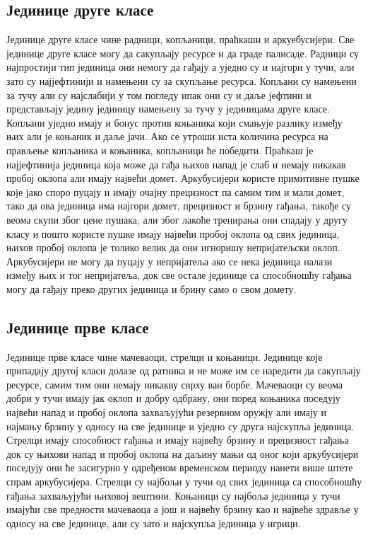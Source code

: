 \documentclass[11pt,a4paper]{article}
\begin{document}
\subsection{Јединице друге класе}
Јединице друге класе чине радници, копљаници, праћкаши и аркуебусијери. Све јединице друге класе могу да сакупљају ресурсе и да граде палисаде. Радници су најпростији тип јединица они немогу да гађају а уједно су и најгори у тучи, али зато су најјефтинији и намењени су за скупљање ресурса. Копљани су намењени за тучу али су најслабији у том погледу ипак они су и даље јефтини и представљају једину јединицу намењену за тучу у јединицама друге класе. Копљани уједно имају и бонус против коњаника који смањује разлику између њих али је коњаник и даље јачи. Ако се утроши иста количина ресурса на прављење копљаника и коњаника, копљаници ће победити. Праћкаш је најјефтинија јединица која може да гађа њихов напад је слаб и немају никакав пробој оклопа али имају највећи домет. Аркубусијери користе примитивне пушке које јако споро пуцају и имају очајну прецизност па самим тим и мали домет, тако да ова јединица има најгори домет, прецизност и брзину гађања, такође су веома скупи због цене пушака, али због лакоће тренирања они спадају у другу класу и пошто користе пушке имају највећи пробој оклопа од свих јединица, њихов пробој оклопа је толико велик да они игноришу непријатељски оклоп. Аркубусијери не могу да пуцају у непријатеља ако се нека јединица налази између њих и тог непријатеља, док све остале јединице са способношћу гађања могу да гађају преко других јединица и брину само о свом домету.

\subsection{Јединице прве класе}
Јединице прве класе чине  мачеваоци, стрелци и коњаници. Јединице које припадају другој класи долазе од ратника и не може им се наредити да сакупљају ресурсе, самим тим они немају никакву сврху ван борбе. Мачеваоци су веома добри у тучи имају јак оклоп и добру одбрану, они поред коњаника поседују највећи напад и пробој оклопа захваљујући резервном оружју али имају и најмању брзину у односу на све јединице и уједно су друга најскупља јединица. Стрелци имају способност гађања и имају највећу брзину и прецизност гађања док су њихови напад и пробој оклопа на даљину мањи од оног који аркубусијери поседују они ће засигурно у одређеном временском периоду нанети више штете спрам аркубусијера. Стрелци су најбољи у тучи од свих јединица са способношћу гађања захваљујући њиховој вештини. Коњаници су најбоља јединица у тучи имајући све предности мачеваоца а још и највећу брзину као и највеће здравље у односу на све јединице, али су зато и најскупља јединица у игрици.
\end{document}

